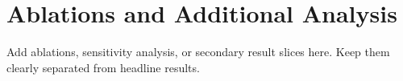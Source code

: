\section{Ablations and Additional Analysis}

Add ablations, sensitivity analysis, or secondary result slices here. Keep them clearly separated from headline results.
